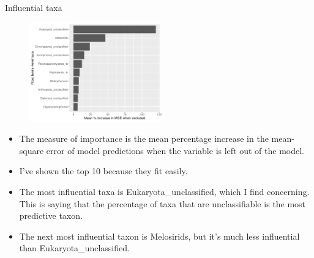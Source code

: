 \documentclass{beamer}
\begin{document}
\begin{frame}{Influential taxa}

  \begin{center}
    \begin{figure}
      \includegraphics[width=2.25in]{w_ribs/families_rib_PercIncMSE_barchart}
    \end{figure}
  \end{center}
  
  {\scriptsize
    \begin{itemize}
    \item The measure of importance is the mean percentage increase in
      the mean-square error of model predictions when the variable is
      left out of the model.
    \item I've shown the top 10 because they fit easily.
    \item The most influential taxa is Eukaryota\_unclassified, which I find
    concerning.  This is saying that the percentage of taxa that are
    unclassifiable is the most predictive taxon.
    \item The next most influential taxon is Melosirids, but it's much less
    influential than Eukaryota\_unclassified.
    \end{itemize}
  }

\end{frame}
\end{document}
